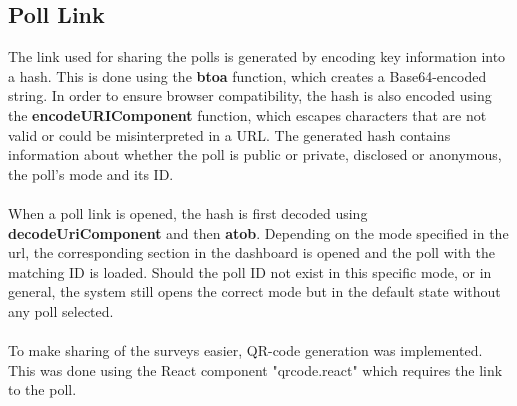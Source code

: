 \documentclass[a4paper,12pt]{report}
\begin{document}
\subsection{Poll Link}
The link used for sharing the polls is generated by encoding key information into a hash. This is done using the \textbf{btoa} function, which creates a Base64-encoded string. In order to ensure browser compatibility, the hash is also encoded using the \textbf{encodeURIComponent} function, which escapes characters that are not valid or could be misinterpreted in a URL. The generated hash contains information about whether the poll is public or private, disclosed or anonymous, the poll's mode and its ID. \parencite{mdn-btoa} \parencite{mdn-encodeUriComponent}\\\\
When a poll link is opened, the hash is first decoded using \textbf{decodeUriComponent} and then \textbf{atob}. Depending on the mode specified in the url, the corresponding section in the dashboard is opened and the poll with the matching ID is loaded. Should the poll ID not exist in this specific mode, or in general, the system still opens the correct mode but in the default state without any poll selected. \parencite{mdn-atob} \parencite{mdn-decodeUriComponent}\\\\
To make sharing of the surveys easier, QR-code generation was implemented. This was done using the React component "qrcode.react" which requires the link to the poll. \parencite{qrcode} \\
\end{document}

